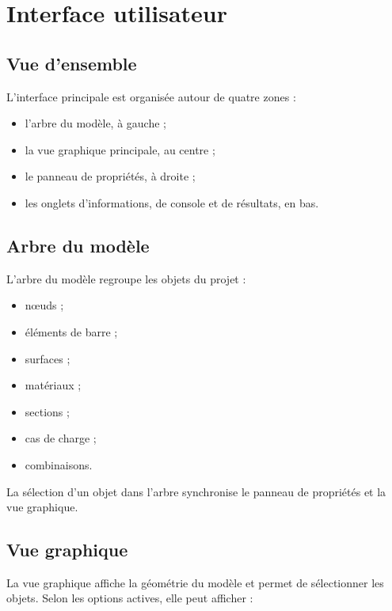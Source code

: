 \chapter{Interface utilisateur}

\section{Vue d'ensemble}

L'interface principale est organisée autour de quatre zones :

\begin{itemize}
  \item l'arbre du modèle, à gauche ;
  \item la vue graphique principale, au centre ;
  \item le panneau de propriétés, à droite ;
  \item les onglets d'informations, de console et de résultats, en bas.
\end{itemize}


\section{Arbre du modèle}

L'arbre du modèle regroupe les objets du projet :

\begin{itemize}
  \item nœuds ;
  \item éléments de barre ;
  \item surfaces ;
  \item matériaux ;
  \item sections ;
  \item cas de charge ;
  \item combinaisons.
\end{itemize}

La sélection d'un objet dans l'arbre synchronise le panneau de propriétés et la
vue graphique.

\section{Vue graphique}

La vue graphique affiche la géométrie du modèle et permet de sélectionner les
objets. Selon les options actives, elle peut afficher :

